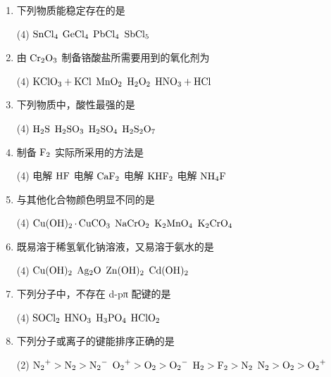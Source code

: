 \begin{enumerate}[label=\arabic*., itemsep=1.5ex]
    \item 下列物质能稳定存在的是
    \begin{tasks}(4)
        \task $\ce{SnCl4}$
        \task $\ce{GeCl4}$
        \task $\ce{PbCl4}$
        \task $\ce{SbCl5}$
    \end{tasks}

    \item 由 $\ce{Cr2O3}$ 制备铬酸盐所需要用到的氧化剂为
    \begin{tasks}(4)
        \task $\ce{KClO3 + KCl}$
        \task $\ce{MnO2}$
        \task $\ce{H2O2}$
        \task $\ce{HNO3 + HCl}$
    \end{tasks}

    \item 下列物质中，酸性最强的是
    \begin{tasks}(4)
        \task $\ce{H2S}$
        \task $\ce{H2SO3}$
        \task $\ce{H2SO4}$
        \task $\ce{H2S2O7}$
    \end{tasks}

    \item 制备 $\ce{F2}$ 实际所采用的方法是
    \begin{tasks}(4)
        \task 电解 $\ce{HF}$
        \task 电解 $\ce{CaF2}$
        \task 电解 $\ce{KHF2}$
        \task 电解 $\ce{NH4F}$
    \end{tasks}

    \item 与其他化合物颜色明显不同的是
    \begin{tasks}(4)
        \task $\ce{Cu(OH)2*CuCO3}$
        \task $\ce{NaCrO2}$
        \task $\ce{K2MnO4}$
        \task $\ce{K2CrO4}$
    \end{tasks}

    \item 既易溶于稀氢氧化钠溶液，又易溶于氨水的是
    \begin{tasks}(4)
        \task $\ce{Cu(OH)2}$
        \task $\ce{Ag2O}$
        \task $\ce{Zn(OH)2}$
        \task $\ce{Cd(OH)2}$
    \end{tasks}

    \item 下列分子中，不存在 d-pπ 配键的是
    \begin{tasks}(4)
        \task $\ce{SOCl2}$
        \task $\ce{HNO3}$
        \task $\ce{H3PO4}$
        \task $\ce{HClO2}$
    \end{tasks}

    \item 下列分子或离子的键能排序正确的是
    \begin{tasks}(2)
        \task $\ce{N2^{+}} > \ce{N2} > \ce{N2^{-}}$
        \task $\ce{O2^{+}} > \ce{O2} > \ce{O2^{-}}$
        \task $\ce{H2} > \ce{F2} > \ce{N2}$
        \task $\ce{N2} > \ce{O2} > \ce{O2^{+}}$
    \end{tasks}


\end{enumerate}
